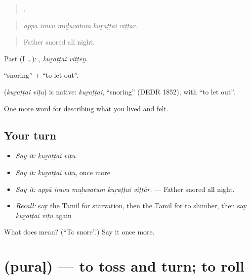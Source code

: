 \begin{quote}
    .
\end{quote}

\begin{quote}
\emph{appā iravu muḻuvatum kuṟaṭṭai viṭṭār.}
\end{quote}

\begin{quote}
Father snored all night.
\end{quote}

Past (I …):  , \emph{kuṟaṭṭai viṭṭēṉ}.

 \textquotedblleft{}snoring\textquotedblright{} +  \textquotedblleft{}to let out\textquotedblright{}.

\begin{cousinweb}
\textbf{ } (\emph{kuṟaṭṭai viṭu}) is native:  \emph{kuṟaṭṭai}, \textquotedblleft{}snoring\textquotedblright{} (DEDR 1852), with  \textquotedblleft{}to let out\textquotedblright{}.
\end{cousinweb}

\begin{grammarlens}[title={What you've built}]
One more word for describing what you lived and felt.
\end{grammarlens}

\subsection*{Your turn}
\begin{itemize}
\raggedright
  \item \emph{Say it:} \emph{kuṟaṭṭai viṭu}
  \item \emph{Say it:} \emph{kuṟaṭṭai viṭu}, once more
  \item \emph{Say it:} \emph{appā iravu muḻuvatum kuṟaṭṭai viṭṭār.} — Father snored all night.
  \item \emph{Recall:} say the Tamil for starvation, then the Tamil for to slumber, then say \emph{kuṟaṭṭai viṭu} again
\end{itemize}

\begin{tcolorbox}[breakable,colback=teal!4,colframe=teal!35!black,title={Before you move on}]
What does   mean? (\textquotedblleft{}To snore\textquotedblright{}.) Say it once more.
\end{tcolorbox}
\section[\texorpdfstring{\ta{புரள்} (puraḷ)}{புரள் (puraḷ)}]{ (puraḷ) — to toss and turn; to roll}

